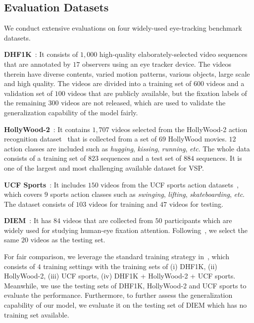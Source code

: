 \documentclass[review]{elsarticle}
\begin{document}
\begin{table*}[t]
{\begin{tabular}{c|r|c|c|c|c|c||c|c|c|c|c||c|c|c|c|c}
\end{tabular}
}
\label{leaderboard}
\end{table*}

\subsection{Evaluation Datasets}
We conduct extensive evaluations on four widely-used eye-tracking benchmark datasets.


\textbf{DHF1K}~\cite{wang2019revisiting}: It consists of $1,000$ high-quality elaborately-selected video sequences that are annotated by $17$ observers using an eye tracker device.
The videos therein have diverse contents, varied motion patterns, various objects, large scale and high quality.
The videos are divided into a training set of $600$ videos and a validation set of $100$ videos that are publicly available, but the fixation labels of the remaining $300$ videos are not released, which are used to validate the generalization capability of the model fairly.

\textbf{HollyWood-2}~\cite{mathe2014actions}: It contains $1,707$ videos selected from the HollyWood-2 action recognition dataset~\cite{marszalek2009actions} that is collected from a set of $69$ HollyWood movies.
$12$ action classes are included such as \textit{hugging}, \textit{kissing}, \textit{running}, \textit{etc}.
The whole data consists of a training set of $823$ sequences and a test set of $884$ sequences.
It is one of the largest and most challenging available dataset for VSP.


\textbf{UCF Sports}~\cite{mathe2014actions}: It includes $150$ videos from the UCF sports action datasets~\cite{rodriguez2008action}, which covers $9$ sports action classes such as \textit{swinging}, \textit{lifting}, \textit{skateboarding}, \textit{etc}.
The dataset consists of $103$ videos for training and $47$ videos for testing.


\textbf{DIEM}~\cite{mital2011clustering}: It has $84$ videos that are collected from $50$ participants which are widely used for studying human-eye fixation attention.
Following~\cite{hossein2015many,lai2019video}, we select the same $20$ videos as the testing set.

For fair comparison, we leverage the standard training strategy in~\cite{wang2018revisiting}, which consists of $4$ training settings with the training sets of (i) DHF1K, (ii) HollyWood-2, (iii) UCF sports, (iv) DHF1K + HollyWood-2 + UCF sports.
Meanwhile, we use the testing sets of DHF1K, HollyWood-2 and UCF sports to evaluate the performance.
Furthermore, to further assess the generalization capability of our model, we evaluate it on the testing set of DIEM which has no training set available.
\end{document}
